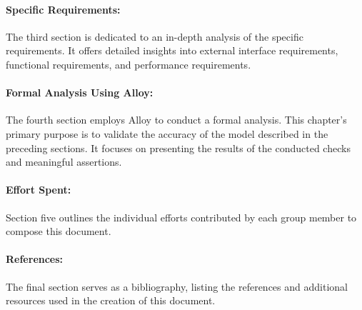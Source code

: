 \paragraph{Specific Requirements:} The third section is dedicated to an in-depth analysis of the specific requirements. It offers detailed insights into external interface requirements, functional requirements, and performance requirements.
\paragraph{Formal Analysis Using Alloy:} The fourth section employs Alloy to conduct a formal analysis. This chapter's primary purpose is to validate the accuracy of the model described in the preceding sections. It focuses on presenting the results of the conducted checks and meaningful assertions.
\paragraph{Effort Spent:} Section five outlines the individual efforts contributed by each group member to compose this document.
\paragraph{References:} The final section serves as a bibliography, listing the references and additional resources used in the creation of this document.

